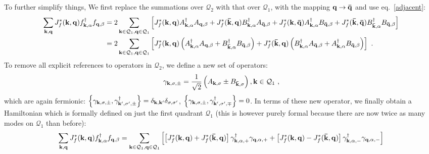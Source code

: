 \documentclass[%
reprint,
superscriptaddress,
groupedaddress,
superscriptaddress,
onecolumn,
]{revtex4-2}
\begin{document}
To further simplify things, We first replace the summations over \(\mathcal{Q}_2\) with that over \(\mathcal{Q}_1\), with the mapping \({\bf q} \to {\bf \bar q}\) and use eq.~\ref{adjacent}:
\begin{equation}\begin{aligned}
	\sum_{{\bf k}, {\bf q}} J_f^*({\bf k},{\bf q}) f^\dagger_{{\bf k},\alpha}f_{{\bf q},\beta} 
	&= 2\sum_{{\bf k} \in \mathcal{Q}_1, {\bf q} \in \mathcal{Q}_1} \left[J_f^*({\bf k},{\bf q}) A^\dagger_{{\bf k},\alpha}A_{{\bf q},\beta} + J_f^*({\bf \bar k},{\bf q}) B^\dagger_{{\bf k},\alpha}A_{{\bf \bar q},\beta} + J_f^*({\bf k},{\bf \bar q}) A^\dagger_{{\bf k},\alpha}B_{{\bf \bar q},\beta} + J_f^*({\bf \bar k},{\bf \bar q}) B^\dagger_{{\bf \bar k},\alpha}B_{{\bf \bar q},\beta}\right]\\
	&= 2\sum_{{\bf k} \in \mathcal{Q}_1, {\bf q} \in \mathcal{Q}_1} \left[J_f^*({\bf k},{\bf q}) \left(A^\dagger_{{\bf k},\alpha}A_{{\bf q},\beta} + B^\dagger_{{\bf \bar k},\alpha}B_{{\bf \bar q},\beta}\right) + J_f^*({\bf \bar k},{\bf q}) \left(B^\dagger_{{\bf k},\alpha}A_{{\bf \bar q},\beta} + A^\dagger_{{\bf k},\alpha}B_{{\bf \bar q},\beta}\right)\right] ~.
\end{aligned}\end{equation}
To remove all explicit references to operators in \(\mathcal{Q}_2\), we define a new set of operators:
\begin{equation}\begin{aligned}
	\gamma_{{\bf k},\sigma,\pm} = \frac{1}{\sqrt{2}}\left(A_{{\bf k},\sigma} \pm B_{{\bf \bar k},\sigma}\right), {\bf k}\in \mathcal{Q}_1~,
\end{aligned}\end{equation}
which are again fermionic: \(\left\{\gamma_{{\bf k},\sigma,\pm}, \gamma_{{\bf k}^\prime,\sigma^\prime,\pm}^\dagger\right\} = \delta_{{\bf k},{\bf k}^\prime}\delta_{\sigma,\sigma^\prime}\), \(\left\{\gamma_{{\bf k},\sigma,\pm}, \gamma_{{\bf k}^\prime,\sigma^\prime,\mp}^\dagger\right\} = 0\). In terms of these new operator, we finally obtain a Hamiltonian which is formally defined on just the first quadrant \(\mathcal{Q}_1\) (this is however purely formal because there are now twice as many modes on \(\mathcal{Q}_1\) than before):
\begin{equation}\begin{aligned}
	\sum_{{\bf k}, {\bf q}} J_f^*({\bf k},{\bf q}) f^\dagger_{{\bf k},\alpha}f_{{\bf q},\beta} 
	&= \sum_{{\bf k} \in \mathcal{Q}_1, {\bf q} \in \mathcal{Q}_1} \left[\left[J_f^*({\bf k},{\bf q}) + J_f^*({\bf \bar k},{\bf q})\right] \gamma^\dagger_{{\bf k},\alpha,+}\gamma_{{\bf q},\alpha,+} + \left[J_f^*({\bf k},{\bf q}) - J_f^*({\bf \bar k},{\bf q})\right] \gamma^\dagger_{{\bf k},\alpha,-}\gamma_{{\bf q},\alpha,-}\right] \\
\end{aligned}\end{equation}
\end{document}
